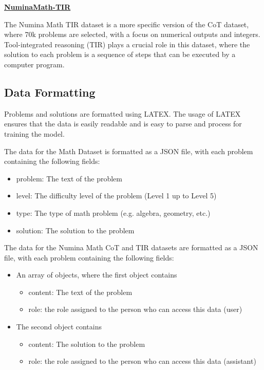 \documentclass{article}
\begin{document}
\href{https://huggingface.co/datasets/AI-MO/NuminaMath-TIR}{{\bf NuminaMath-TIR}}

The Numina Math TIR dataset is a more specific version of the CoT dataset, where 70k problems are selected, with a focus on numerical outputs and integers. Tool-integrated reasoning (TIR) plays a crucial role in this dataset, where the solution to each problem is a sequence of steps that can be executed by a computer program.
\cite{numina_math_datasets_TIR}

\subsection{Data Formatting}

Problems and solutions are formatted using LATEX. The usage of LATEX ensures that the data is easily readable and is easy to parse and process for training the model.

The data for the Math Dataset is formatted as a JSON file, with each problem containing the following fields:
\begin{itemize}
  \item problem: The text of the problem
  \item level: The difficulty level of the problem (Level 1 up to Level 5)
  \item type: The type of math problem (e.g. algebra, geometry, etc.)
  \item solution: The solution to the problem
\end{itemize}

The data for the Numina Math CoT and TIR datasets are formatted as a JSON file, with each problem containing the following fields:
\begin{itemize}
  \item An array of objects, where the first object contains
      \begin{itemize}
        \item content: The text of the problem
        \item role: the role assigned to the person who can access this data (user)
      \end{itemize}
  \item The second object contains
      \begin{itemize}
        \item content: The solution to the problem
        \item role: the role assigned to the person who can access this data (assistant)
      \end{itemize}
\end{itemize}
\end{document}
